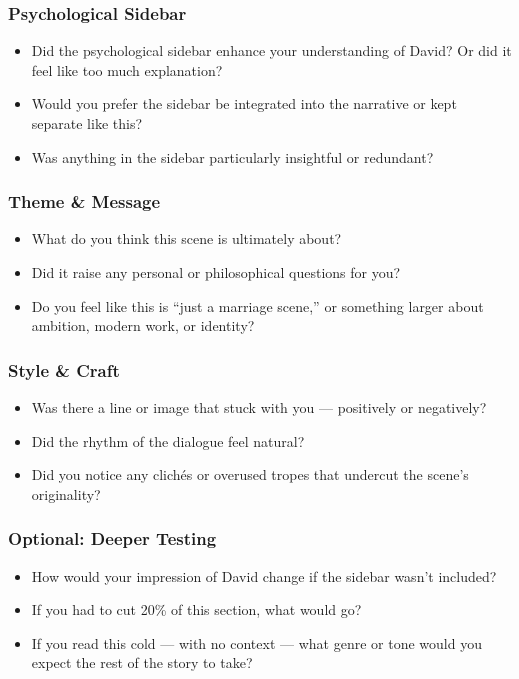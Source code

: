 \subsubsection{Psychological Sidebar}

\begin{itemize}
  \item Did the psychological sidebar enhance your understanding of David? Or did it feel like too much explanation?
  \item Would you prefer the sidebar be integrated into the narrative or kept separate like this?
  \item Was anything in the sidebar particularly insightful or redundant?
\end{itemize}

\subsubsection{Theme \& Message}

\begin{itemize}
  \item What do you think this scene is ultimately about?
  \item Did it raise any personal or philosophical questions for you?
  \item Do you feel like this is “just a marriage scene,” or something larger about ambition, modern work, or identity?
\end{itemize}

\subsubsection{Style \& Craft}

\begin{itemize}
  \item Was there a line or image that stuck with you — positively or negatively?
  \item Did the rhythm of the dialogue feel natural?
  \item Did you notice any clichés or overused tropes that undercut the scene’s originality?
\end{itemize}

\subsubsection{Optional: Deeper Testing}

\begin{itemize}
  \item How would your impression of David change if the sidebar wasn’t included?
  \item If you had to cut 20\% of this section, what would go?
  \item If you read this cold — with no context — what genre or tone would you expect the rest of the story to take?
\end{itemize}



